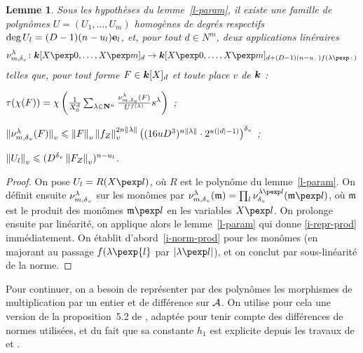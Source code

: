 \documentclass[11pt, twoside, a4paper]{article}
\newtheorem{lem}[thm]{Lemme} \newtheorem{coro}[thm]{Corollaire}
\theoremstyle{definition}
\begin{document}
\begin{lem} \label{l-par-prod}
  Sous les hypothèses du lemme~\ref{l-param}, il existe une famille de polynômes
  $U = (U_1, \ldots, U_m)$ homogènes de degrés respectifs $\deg U_l =
  (D-1)(n-u_l){\mathbf e}_l$, et, pour tout $d \in N^m$, deux applications linéraires
  \[
    \nu_{m, \dv}^\lambda \colon \cdn[X\pexp 0, \ldots, X\pexp m]_d \to
    \cdn[X\pexp 0, \ldots, X\pexp m]_{d + (D-1)(n-u_\truc)f(\lambda\pexp\truc)}
  \]
  telles que, pour tout forme $F\in \boldsymbol{k}[X]_d$ et toute place $v$ de $\boldsymbol{k}$ :
  \begin{enumthm}
    \item \label{i-repr-prod} $\tau(\chi(F)) =
      \chi\left( \frac1{X_0^d} \sum_{\lambda \in \cramped{\N^u}}
      \frac {\nu_{m, \dv}^\lambda(F)} {U^{f(\lambda)}} s^\lambda \right)$ ;
    \item \label{i-norm-prod} $\left\lVert\smash{\nu_{m, {\delta\smash{_v}}}^\lambda(F)}\right\rVert_{v} \leqslant \left\lVert F\right\rVert_{v}
      \left\lVert f_Z\right\rVert_{v}^{2n\lVert\lambda\rVert} \bigl(
      (16uD^3)^{n\lVert\lambda\rVert} \cdot 2^{u({\lvert d\rvert} -1)} \bigr)^{\delta\smash{_v}}$ ;
    \item $\left\lVert U_l\right\rVert_{v} \leqslant (D^{\delta\smash{_v}} \left\lVert F_Z\right\rVert_{v})^{n-u_l}$.
  \end{enumthm}
\end{lem}

\begin{proof}
  On pose $U_l = R(X\pexp l)$, où $R$ est le polynôme du lemme~\ref{l-param}.
  On définit ensuite $\nu_{m, {\delta\smash{_v}}}^\lambda$ sur les monômes par $\nu_{m,
  \dv}^\lambda(\mathfrak m) = \prod_l \nu_\dv^{\lambda\pexp l}(\mathfrak m\pexp
  l)$, où $\mathfrak m$ est le produit des monômes $\mathfrak m\pexp l$ en les
  variables $X\pexp l$. On prolonge ensuite par linéarité, on applique alors le
  lemme~\ref{l-param} qui donne \ref{i-repr-prod} immédiatement. On établit
  d'abord~\ref{i-norm-prod} pour les monômes (en majorant au passage
  $f(\lambda\pexp{l}$ par $\lgr{\lambda\pexp l}$), et on conclut par
  sous-linéarité de la norme.  
\end{proof}

Pour continuer, on a besoin de représenter par des polynômes les morphismes de
multiplication par un entier et de différence sur $\mathcal A$. On utilise pour cela une
version de la proposition~5.2 de , adaptée pour tenir compte des
différences de normes utilisées, et du fait que sa constante $h_1$ est explicite
depuis les travaux de  et .
\end{document}
